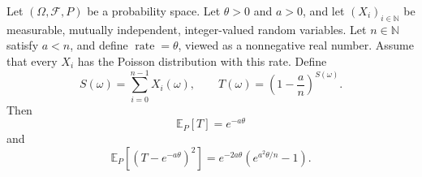 \begin{theorem}
Let $(\Omega,\mathcal F,P)$ be a probability space. Let $\theta>0$ and
$a>0$, and let $(X_i)_{i\in\mathbb N}$ be measurable, mutually independent,
integer-valued random variables. Let $n\in\mathbb N$ satisfy $a<n$, and
define $\operatorname{rate}=\theta$, viewed as a nonnegative real number.
Assume that every $X_i$ has the Poisson distribution with this rate.
Define
\[
 S(\omega)=\sum_{i=0}^{n-1}X_i(\omega),\qquad
 T(\omega)=\left(1-\frac an\right)^{S(\omega)}.
\]
Then
\[
 \mathbb E_P[T]=e^{-a\theta}
\]
and
\[
 \mathbb E_P\!\left[(T-e^{-a\theta})^2\right]
 =e^{-2a\theta}\left(e^{a^2\theta/n}-1\right).
\]
\end{theorem}
